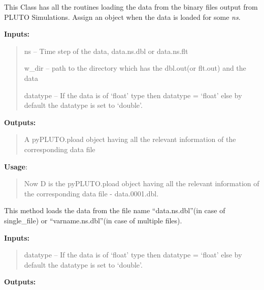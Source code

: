 \documentclass[letterpaper,10pt,english]{sphinxmanual}
\begin{document}
\begin{fulllineitems}
\label{pload:pyPLUTO.pload}
This Class has all the routines loading the data from the
binary files output from PLUTO Simulations. Assign an object
when the data is loaded for some \emph{ns}.

\textbf{Inputs:}
\begin{quote}

ns -- Time step of the data, data.ns.dbl or data.ns.flt

w\_dir -- path to the directory which has the dbl.out(or flt.out) and the data

datatype -- If the data is of `float' type then datatype = `float' else by default the datatype is set to `double'.
\end{quote}

\textbf{Outputs:}
\begin{quote}

A pyPLUTO.pload object  having all the relevant information of the corresponding data file
\end{quote}

\textbf{Usage}:
\begin{quote}




Now D is the pyPLUTO.pload object having all the relevant information
of the corresponding data file - data.0001.dbl.
\end{quote}

\begin{fulllineitems}
\label{pload:pyPLUTO.pload.data}
This method loads the data from the file name ``data.ns.dbl''(in case of single\_file) or ``varname.ns.dbl''(in case of multiple files).

\textbf{Inputs:}
\begin{quote}

datatype -- If the data is of `float' type then datatype = `float' else by default the datatype is set to `double'.
\end{quote}

\textbf{Outputs:}
\begin{quote}


\end{quote}
\end{fulllineitems}
\end{fulllineitems}
\end{document}
